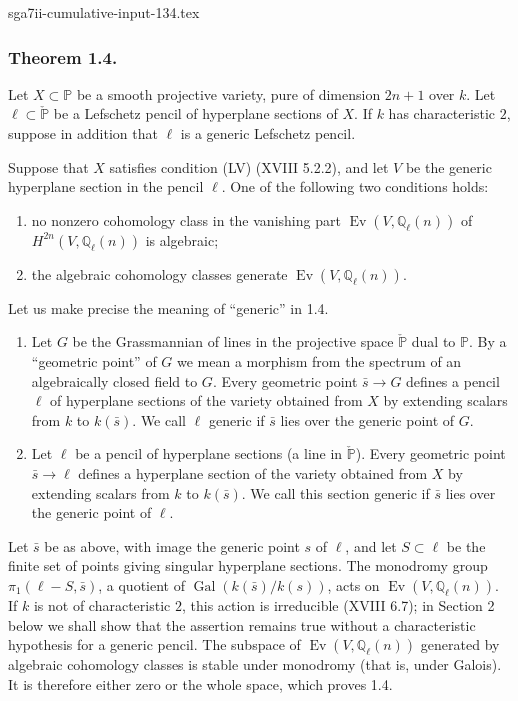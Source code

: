 \begin{filecontents*}{sga7ii-cumulative-input-134.tex}
\subsubsection*{Theorem 1.4.}
Let $X\subset\mathbb P$ be a smooth projective variety, pure of dimension
$2n+1$ over $k$.  Let $\ell\subset\check{\mathbb P}$ be a Lefschetz pencil
of hyperplane sections of $X$.  If $k$ has characteristic $2$, suppose in
addition that $\ell$ is a generic Lefschetz pencil.

Suppose that $X$ satisfies condition (LV) (XVIII 5.2.2), and let $V$ be the
generic hyperplane section in the pencil $\ell$.  One of the following two
conditions holds:
\begin{enumerate}[label=(\alph*)]
\item no nonzero cohomology class in the vanishing part
  $\operatorname{Ev}(V,\mathbb Q_\ell(n))$ of
  $H^{2n}(V,\mathbb Q_\ell(n))$ is algebraic;
\item the algebraic cohomology classes generate
  $\operatorname{Ev}(V,\mathbb Q_\ell(n))$.
\end{enumerate}

Let us make precise the meaning of ``generic'' in 1.4.

\begin{enumerate}[label=(\alph*)]
\item Let $G$ be the Grassmannian of lines in the projective space
  $\check{\mathbb P}$ dual to $\mathbb P$.  By a ``geometric point'' of
  $G$ we mean a morphism from the spectrum of an algebraically closed field
  to $G$.  Every geometric point $\bar s\to G$ defines a pencil $\ell$ of
  hyperplane sections of the variety obtained from $X$ by extending scalars
  from $k$ to $k(\bar s)$.  We call $\ell$ generic if $\bar s$ lies over
  the generic point of $G$.
\item Let $\ell$ be a pencil of hyperplane sections (a line in
  $\check{\mathbb P}$).  Every geometric point $\bar s\to\ell$ defines a
  hyperplane section of the variety obtained from $X$ by extending scalars
  from $k$ to $k(\bar s)$.  We call this section generic if $\bar s$ lies
  over the generic point of $\ell$.
\end{enumerate}

Let $\bar s$ be as above, with image the generic point $s$ of $\ell$, and
let $S\subset\ell$ be the finite set of points giving singular hyperplane
sections.  The monodromy group $\pi_1(\ell-S,\bar s)$, a quotient of
$\operatorname{Gal}(k(\bar s)/k(s))$, acts on
$\operatorname{Ev}(V,\mathbb Q_\ell(n))$.  If $k$ is not of characteristic
$2$, this action is irreducible (XVIII 6.7); in Section 2 below we shall show
that the assertion remains true without a characteristic hypothesis for a
generic pencil.  The subspace of $\operatorname{Ev}(V,\mathbb Q_\ell(n))$
generated by algebraic cohomology classes is stable under monodromy (that is,
under Galois).  It is therefore either zero or the whole space, which proves
1.4.


\end{filecontents*}
